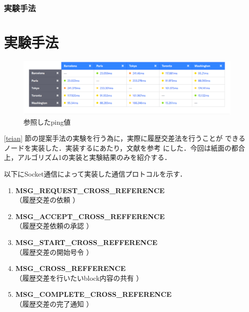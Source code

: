 \documentclass[a4paper,12pt]{jsarticle}
\begin{document}
\subsubsection{実験手法}

\section{実験手法}
\label{syuhou}

%
\begin{figure}[tb]
  \begin{center}
    \includegraphics[width=160mm]{pht/Screenshot.eps}
  \end{center}
	\caption{参照したping値\cite{pings}}
  \label{fig:pings}
\end{figure}
%
\ref{teian} 節の提案手法の実験を行う為に，実際に履歴交差法を行うことが
できるノードを実装した．実装するにあたり，文献\cite{hamatsu2018}を参考
にした．今回は紙面の都合上，アルゴリズム1の実装と実験結果のみを紹介する．

以下にSocket通信によって実装した通信プロトコルを示す．

\hspace{5mm}
%
\begin{enumerate}
\item \textbf{MSG\_REQUEST\_CROSS\_REFERENCE}\\
\hspace{12mm} （履歴交差の依頼 ）
\item \textbf{MSG\_ACCEPT\_CROSS\_REFFERENCE}\\
\hspace{12mm}  （履歴交差依頼の承認 ）
  \item \textbf{MSG\_START\_CROSS\_REFFERENCE}\\
\hspace{12mm}  （履歴交差の開始号令 ）
  \item \textbf{MSG\_CROSS\_REFFERENCE}\\
\hspace{12mm}  （履歴交差を行いたいblock内容の共有 ）
  \item \textbf{MSG\_COMPLETE\_CROSS\_REFERENCE}\\
\hspace{12mm}  （履歴交差の完了通知 ）
\end{enumerate}
%
\hspace{5mm}
\end{document}
